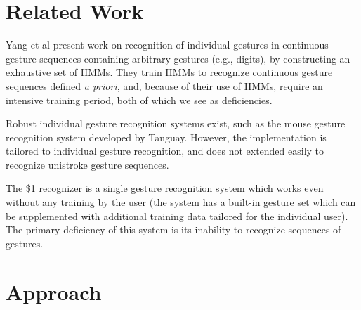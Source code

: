 \documentclass[twoside]{article}
\begin{document}
\begin{multicols}{2}
\section{Related Work}
Yang et al \cite{yang_gesture_1994} present work on recognition of individual
gestures in continuous gesture sequences containing arbitrary gestures (e.g.,
digits), by constructing an exhaustive set of HMMs. They train HMMs to recognize 
continuous gesture sequences defined \textit{a priori}, and, because of their use 
of HMMs, require an intensive training period, both of which we see as deficiencies.

Robust individual gesture recognition systems exist, such as the mouse gesture
recognition system developed by Tanguay\cite{tanguay_jr_hidden_1995}. However,
the implementation is tailored to individual gesture recognition, and does not
extended easily to recognize unistroke gesture sequences.

The \$1 recognizer \cite{wobbrock2007gestures} is a single gesture recognition
system which works even without any training by the user (the system has a
built-in gesture set which can be supplemented with additional training data
tailored for the individual user). The primary deficiency of this system is its
inability to recognize sequences of gestures.

\section{Approach}

\end{multicols}
\end{document}
